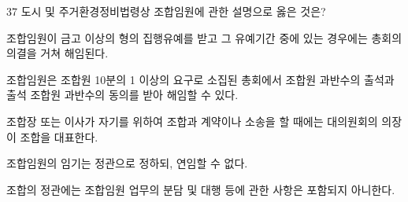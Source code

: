 \begin{question}{37}
도시 및 주거환경정비법령상 조합임원에 관한 설명으로 옳은 것은?
\begin{choices}
  \item 조합임원이 금고 이상의 형의 집행유예를 받고 그 유예기간 중에 있는 경우에는 총회의 의결을 거쳐 해임된다.
  \item 조합임원은 조합원 10분의 1 이상의 요구로 소집된 총회에서 조합원 과반수의 출석과 출석 조합원 과반수의 동의를 받아 해임할 수 있다.
  \item 조합장 또는 이사가 자기를 위하여 조합과 계약이나 소송을 할 때에는 대의원회의 의장이 조합을 대표한다.
  \item 조합임원의 임기는 정관으로 정하되, 연임할 수 없다.
  \item 조합의 정관에는 조합임원 업무의 분담 및 대행 등에 관한 사항은 포함되지 아니한다.
\end{choices}
\end{question}
